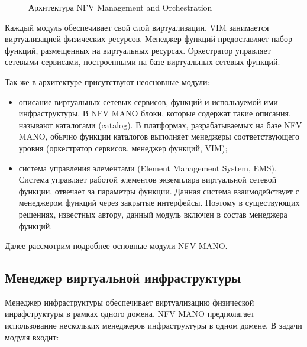 \documentclass[oneside,final,14pt,a4paper]{extreport}
\begin{document}
\begin{figure}[h]
\caption{Архитектура NFV Management and Orchestration}
\label{nfv-mano-image1}
\end{figure}

Каждый модуль обеспечивает свой слой виртуализации. VIM занимается виртуализацией физических ресурсов. Менеджер функций предоставляет набор функций, размещенных на виртуальных ресурсах. Оркестратор управляет сетевыми сервисами, построенными на базе виртуальных сетевых функций.

Так же в архитектуре присутствуют неосновные модули:
\begin{itemize}
	\item описание виртуальных сетевых сервисов, функций и используемой ими инфраструктуры. В NFV MANO блоки, которые содержат такие описания, называют каталогами (catalog). В платформах, разрабатываемых на базе NFV MANO, обычно функции каталогов выполняет менеджеры соответствующего уровня (оркестратор сервисов, менеджер функций, VIM);
	\item система управления элементами (Element Management System, EMS). Система управляет работой элементов экземпляра виртуальной сетевой функции, отвечает за параметры функции. Данная система взаимодействует с менеджером функций через закрытые интерфейсы. Поэтому в существующих решениях, известных автору, данный модуль включен в состав менеджера функций.
\end{itemize}

Далее рассмотрим подробнее основные модули NFV MANO.

\subsection{Менеджер виртуальной инфраструктуры}
Менеджер инфраструктуры обеспечивает виртуализацию физической инрафструктуры в рамках одного домена. NFV MANO предполагает использование нескольких менеджеров инфраструктуры в одном домене. В задачи модуля входит:
\end{document}
